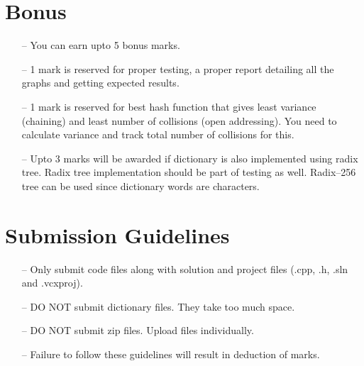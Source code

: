 \documentclass[12pt,a4paper]{article}
\begin{document}
\section{Bonus}
\begin{itemize}
\item[--] You can earn upto 5 bonus marks.
\item[--] 1 mark is reserved for proper testing, a proper report detailing all the graphs and getting expected results.
\item[--] 1 mark is reserved for best hash function that gives least variance (chaining) and least number of collisions (open addressing). You need to calculate variance and track total number of collisions for this.
\item[--] Upto 3 marks will be awarded if dictionary is also implemented using radix tree. Radix tree implementation should be part of testing as well. Radix--256 tree can be used since dictionary words are characters.
\end{itemize}
\section{Submission Guidelines}
\begin{itemize}
\item[--] Only submit code files along with solution and project files (.cpp, .h, .sln and .vcxproj).
\item[--] DO NOT submit dictionary files. They take too much space.
\item[--] DO NOT submit zip files. Upload files individually.
\item[--] Failure to follow these guidelines will result in deduction of marks.
\end{itemize}
\end{document}

